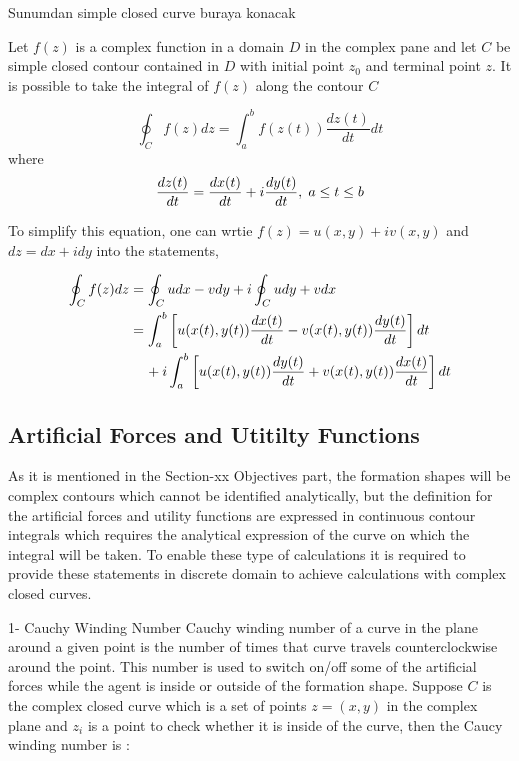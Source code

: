 \documentclass[twoside]{article}
\begin{document}
		Sunumdan simple closed curve buraya konacak
		
		Let $f(z)$ is a complex function in a domain $D$ in the complex pane and let $C$ be simple closed contour contained in $D$ with initial point $z_0$ and terminal point  $z$. It is possible to take the integral of $f(z)$ along the contour $C$
		
		\begin{equation}
    \oint_C f(z) dz = \int_{a}^{b} f(z(t))\frac{dz(t)}{dt} dt
		\end{equation}
		where
		\begin{equation}
\frac{dz(t)}{dt} = \frac{dx(t)}{dt} + i\frac{dy(t)}{dt},   \hspace{0.1cm} a\leq t\leq b
		\end{equation}
		
		To simplify this equation, one can wrtie $f(z) = u(x,y) + iv(x,y)$ and $dz = dx + idy$ into the statements,
		
		\begin{align*}
\oint_C f(z)dz & = \oint_C u dx - v dy + i \oint_C u dy + v dx \\
                        &= \int_{a}^{b}\left[u(x(t),y(t) )\frac{dx(t)}{dt} - v(x(t),y(t) )\frac{dy(t)}{dt}\right]dt\\
                        & \hspace{0.4cm} + i\int_{a}^{b} \left[u(x(t),y(t) )\frac{dy(t)}{dt} + v(x(t),y(t) )\frac{dx(t)}{dt}\right]dt
		\end{align*}
		
     \subsection{Artificial Forces and Utitilty Functions}
		As it is mentioned in the Section-xx Objectives part, the formation shapes will be complex contours which cannot be identified analytically, but the definition for the artificial forces and utility functions are expressed in continuous contour integrals which requires the analytical expression of the curve on which the integral will be taken. To enable these type of calculations it is required to provide these statements in discrete domain to achieve calculations with complex closed curves.

		1- Cauchy Winding Number
		Cauchy winding number of a curve in the plane around a given point is the number of times that curve travels counterclockwise around the point. This number is used to switch on/off some of the artificial forces while the agent is inside or outside of the formation shape. Suppose $C$ is the complex closed curve which is a set of points $z=(x,y)$ in the complex plane  and $z_i$ is a point to check whether it is inside of the curve, then the Caucy winding number is :
					
\end{document}
